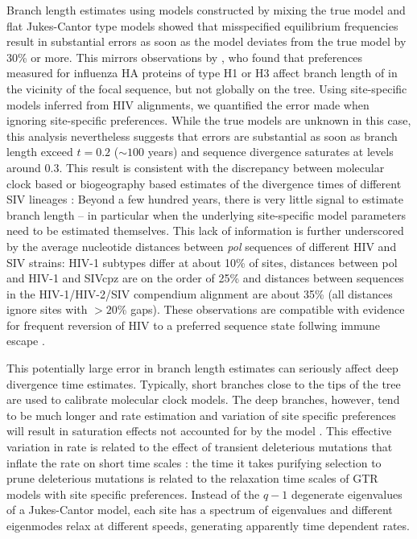 \documentclass[aps,rmp,twocolumn]{revtex4}
\newcommand{\gene}[1]{{\it #1}}
\begin{document}
Branch length estimates using models constructed by mixing the true model and flat Jukes-Cantor type models showed that misspecified equilibrium frequencies result in substantial errors as soon as the model deviates from the true model by 30\% or more.
This mirrors observations by \citet{hilton_modeling_2018}, who found that preferences measured for influenza HA proteins of type H1 or H3 affect branch length of in the vicinity of the focal sequence, but not globally on the tree.
Using site-specific models inferred from HIV alignments, we quantified the error made when ignoring site-specific preferences.
While the true models are unknown in this case, this analysis nevertheless suggests that errors are substantial as soon as branch length exceed $t=0.2$ ($\sim 100$ years) and sequence divergence saturates at levels around 0.3.
This result is consistent with the discrepancy between molecular clock based or biogeography based estimates of the divergence times of different SIV lineages \citep{worobey_island_2010}:
Beyond a few hundred years, there is very little signal to estimate branch length -- in particular when the underlying site-specific model parameters need to be estimated themselves.
This lack of information is further underscored by the average nucleotide distances between \gene{pol} sequences of different HIV and SIV strains:  HIV-1 subtypes differ at about 10\% of sites, distances between pol and HIV-1 and SIVcpz are on the order of 25\% and distances between sequences in the HIV-1/HIV-2/SIV compendium alignment are about 35\% (all distances ignore sites with $>20$\% gaps).
These observations are compatible with evidence for frequent reversion of HIV to a preferred sequence state follwing immune escape \citep{zanini2015population,carlson_selection_2014,leslie_hiv_2004}.


This potentially large error in branch length estimates can seriously affect deep divergence time estimates.
Typically, short branches close to the tips of the tree are used to calibrate molecular clock models.
The deep branches, however, tend to be much longer and rate estimation and variation of site specific preferences will result in saturation effects not accounted for by the model \citep{hilton_modeling_2018}.
This effective variation in rate is related to the effect of transient deleterious mutations that inflate the rate on short time scales \citep{ho_time_2005,wertheim_purifying_2011}: the time it takes purifying selection to prune deleterious mutations is related to the relaxation time scales of GTR models with site specific preferences.
Instead of the $q-1$ degenerate eigenvalues of a Jukes-Cantor model, each site has a spectrum of eigenvalues and different eigenmodes relax at different speeds, generating apparently time dependent rates.
\end{document}
